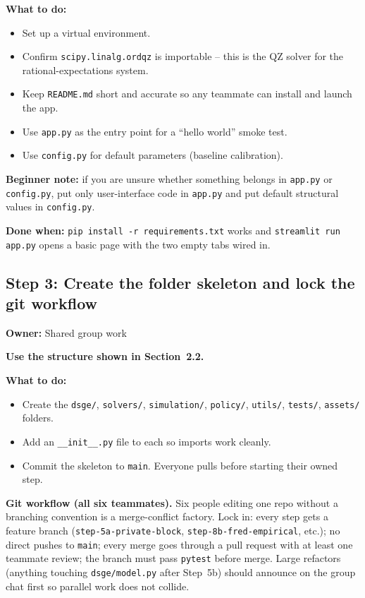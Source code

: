 \documentclass[11pt]{article}
\begin{document}
\textbf{What to do:}
\begin{itemize}
    \item Set up a virtual environment.
    \item Confirm \texttt{scipy.linalg.ordqz} is importable -- this is the QZ solver for the rational-expectations system.
    \item Keep \texttt{README.md} short and accurate so any teammate can install and launch the app.
    \item Use \texttt{app.py} as the entry point for a ``hello world'' smoke test.
    \item Use \texttt{config.py} for default parameters (baseline calibration).
\end{itemize}

\textbf{Beginner note:} if you are unsure whether something belongs in \texttt{app.py} or \texttt{config.py}, put only user-interface code in \texttt{app.py} and put default structural values in \texttt{config.py}.

\textbf{Done when:} \texttt{pip install -r requirements.txt} works and \texttt{streamlit run app.py} opens a basic page with the two empty tabs wired in.

\subsection{Step 3: Create the folder skeleton and lock the git workflow}
\textbf{Owner:} Shared group work

\textbf{Use the structure shown in Section~2.2.}

\textbf{What to do:}
\begin{itemize}
    \item Create the \texttt{dsge/}, \texttt{solvers/}, \texttt{simulation/}, \texttt{policy/}, \texttt{utils/}, \texttt{tests/}, \texttt{assets/} folders.
    \item Add an \texttt{\_\_init\_\_.py} file to each so imports work cleanly.
    \item Commit the skeleton to \texttt{main}. Everyone pulls before starting their owned step.
\end{itemize}

\begin{notebox}
\textbf{Git workflow (all six teammates).} Six people editing one repo without a branching convention is a merge-conflict factory. Lock in: every step gets a feature branch (\texttt{step-5a-private-block}, \texttt{step-8b-fred-empirical}, etc.); no direct pushes to \texttt{main}; every merge goes through a pull request with at least one teammate review; the branch must pass \texttt{pytest} before merge. Large refactors (anything touching \texttt{dsge/model.py} after Step~5b) should announce on the group chat first so parallel work does not collide.
\end{notebox}
\end{document}
